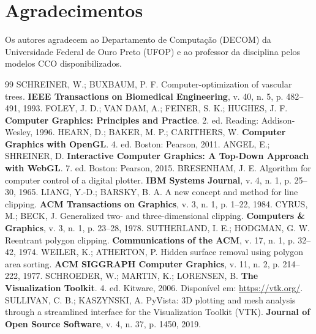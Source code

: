 \documentclass[11pt, a4paper]{article}
\begin{document}
\section*{Agradecimentos}
Os autores agradecem ao Departamento de Computação (DECOM) da Universidade Federal de Ouro Preto (UFOP) e ao professor da disciplina pelos modelos CCO disponibilizados.

\begin{thebibliography}{99}
   SCHREINER, W.; BUXBAUM, P. F. Computer-optimization of vascular trees. \textbf{IEEE Transactions on Biomedical Engineering}, v. 40, n. 5, p. 482--491, 1993.
   FOLEY, J. D.; VAN DAM, A.; FEINER, S. K.; HUGHES, J. F. \textbf{Computer Graphics: Principles and Practice}. 2. ed. Reading: Addison-Wesley, 1996.
   HEARN, D.; BAKER, M. P.; CARITHERS, W. \textbf{Computer Graphics with OpenGL}. 4. ed. Boston: Pearson, 2011.
   ANGEL, E.; SHREINER, D. \textbf{Interactive Computer Graphics: A Top-Down Approach with WebGL}. 7. ed. Boston: Pearson, 2015.
   BRESENHAM, J. E. Algorithm for computer control of a digital plotter. \textbf{IBM Systems Journal}, v. 4, n. 1, p. 25--30, 1965.
   LIANG, Y.-D.; BARSKY, B. A. A new concept and method for line clipping. \textbf{ACM Transactions on Graphics}, v. 3, n. 1, p. 1--22, 1984.
   CYRUS, M.; BECK, J. Generalized two- and three-dimensional clipping. \textbf{Computers \& Graphics}, v. 3, n. 1, p. 23--28, 1978.
   SUTHERLAND, I. E.; HODGMAN, G. W. Reentrant polygon clipping. \textbf{Communications of the ACM}, v. 17, n. 1, p. 32--42, 1974.
   WEILER, K.; ATHERTON, P. Hidden surface removal using polygon area sorting. \textbf{ACM SIGGRAPH Computer Graphics}, v. 11, n. 2, p. 214--222, 1977.
   SCHROEDER, W.; MARTIN, K.; LORENSEN, B. \textbf{The Visualization Toolkit}. 4. ed. Kitware, 2006. Disponível em: \url{https://vtk.org/}.
   SULLIVAN, C. B.; KASZYNSKI, A. PyVista: 3D plotting and mesh analysis through a streamlined interface for the Visualization Toolkit (VTK). \textbf{Journal of Open Source Software}, v. 4, n. 37, p. 1450, 2019.
\end{thebibliography}
\end{document}
